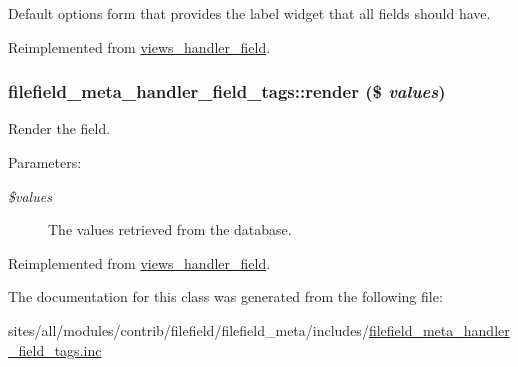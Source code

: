 Default options form that provides the label widget that all fields should have. 

Reimplemented from \hyperlink{classviews__handler__field_0435d161922b7b4b84f02a2e79bb947a}{views\_\-handler\_\-field}.\hypertarget{classfilefield__meta__handler__field__tags_65aaea80f0139f1a83bd876273fdec51}{
\subsubsection[{render}]{\setlength{\rightskip}{0pt plus 5cm}filefield\_\-meta\_\-handler\_\-field\_\-tags::render (\$ {\em values})}}
\label{classfilefield__meta__handler__field__tags_65aaea80f0139f1a83bd876273fdec51}


Render the field.

\begin{Desc}
\item[Parameters:]
\begin{description}
\item[{\em \$values}]The values retrieved from the database. \end{description}
\end{Desc}


Reimplemented from \hyperlink{classviews__handler__field_82ff951c5e9ceb97b2eab86f880cbc1e}{views\_\-handler\_\-field}.

The documentation for this class was generated from the following file:\begin{CompactItemize}
\item 
sites/all/modules/contrib/filefield/filefield\_\-meta/includes/\hyperlink{filefield__meta__handler__field__tags_8inc}{filefield\_\-meta\_\-handler\_\-field\_\-tags.inc}\end{CompactItemize}
